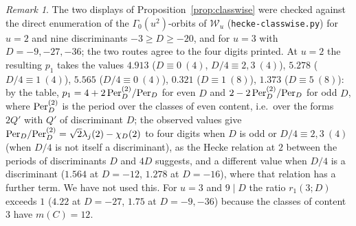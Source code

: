 \documentclass[11pt,a4paper]{article}
\theoremstyle{remark}\newtheorem{remark}[theorem]{Remark}
\begin{document}
\begin{remark}\label{rem:classwise}
The two displays of Proposition~\ref{prop:classwise} were checked against the direct enumeration of the
$\Gamma_0(u^2)$-orbits of $\mathcal W_u$ (\texttt{hecke-classwise.py}) for $u=2$ and nine discriminants
$-3\ge D\ge-20$, and for $u=3$ with $D=-9,-27,-36$; the two routes agree to the four digits printed. At $u=2$ the resulting $p_1$ takes the values
$4.913$ ($D\equiv0\ (4)$, $D/4\equiv2,3\ (4)$), $5.278$ ($D/4\equiv1\ (4)$), $5.565$ ($D/4\equiv0\ (4)$), $0.321$ ($D\equiv1\ (8)$),
$1.373$ ($D\equiv5\ (8)$): by the table, $p_1=4+2\,\mathrm{Per}^{(2)}_D/\mathrm{Per}_D$ for even $D$ and $2-2\,\mathrm{Per}^{(2)}_D/\mathrm{Per}_D$ for odd $D$, where
$\mathrm{Per}^{(2)}_D$ is the period over the classes of even content, i.e.\ over the forms $2Q'$ with $Q'$ of discriminant $D$; the observed
values give $\mathrm{Per}_D/\mathrm{Per}^{(2)}_D=\sqrt2\lambda_j(2)-\chi_D(2)$ to four digits when $D$ is odd or $D/4\equiv2,3\ (4)$ (when $D/4$ is
not itself a discriminant), as the Hecke relation at $2$ between the periods of discriminants $D$ and $4D$ suggests, and a
different value when $D/4$ is a discriminant ($1.564$ at $D=-12$, $1.278$ at $D=-16$), where that relation has a further term. We have not used this. For $u=3$ and $9\mid D$ the ratio $r_1(3;D)$ exceeds $1$
($4.22$ at $D=-27$, $1.75$ at $D=-9,-36$) because the classes of content $3$ have $m(C)=12$.
\end{remark}
\end{document}
